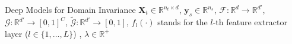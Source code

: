 \documentclass[aspectratio=169]{beamer}
\providecommand{\mat}[1]{{\bm{#1}}}
\providecommand{\ve}[1]{{\bm{#1}}}
\begin{document}
\begin{frame}{Deep Models for Domain Invariance}
    \vspace{1cm} 
    \footnotesize 
    $\mat{X}_t \in \mathbb{R}^{n_t \times d}$, $\ve{y}_s\in \mathbb{R}^{n_s}$, $\mathcal{F}: \mathbb{R}^{d} \to \mathbb{R}^{d'}$, $\mathcal{G}: \mathbb{R}^{d'} \to [0,1]^C$, $\tilde{\mathcal{G}}: \mathbb{R}^{d'} \to [0,1]$, $f_l(\cdot)$ stands for the $l$-th feature extractor layer {($ l\in\{1,\dots,L\}$)} , $\lambda \in \mathbb{R}^+$

\end{frame}

        
\end{document}
